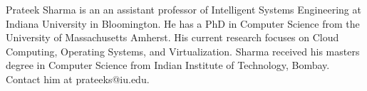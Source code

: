 \documentclass[compsoc]{IEEEtran}
\begin{document}
\begin{IEEEbiography}{Prateek Sharma}
  is an an assistant professor of Intelligent Systems Engineering at Indiana University in Bloomington. He has a PhD in Computer Science from 
the University of Massachusetts Amherst. His current research
  focuses on Cloud Computing, Operating Systems, and
  Virtualization. Sharma received his masters degree in Computer Science from
  Indian Institute of Technology, Bombay. Contact him at
  prateeks@iu.edu.
\end{IEEEbiography}




 
\end{document}
